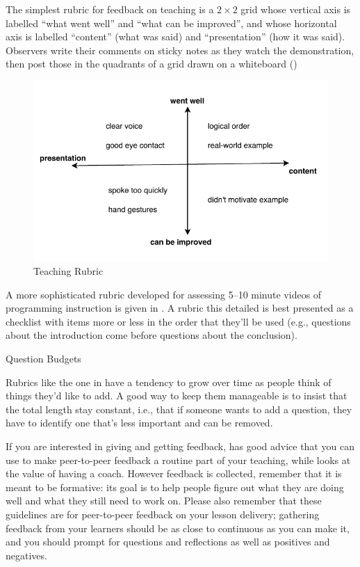The simplest rubric for feedback on teaching is a $2{\times}2$ grid
whose vertical axis is labelled ``what went well'' and ``what can be
improved'', and whose horizontal axis is labelled ``content'' (what
was said) and ``presentation'' (how it was said). Observers write
their comments on sticky notes as they watch the demonstration, then
post those in the quadrants of a grid drawn on a whiteboard
()

\begin{figure}
\centering
\includegraphics{../docs/fig/2x2-rubric.pdf}
\caption{Teaching Rubric}
\label{f:performance-rubric}
\end{figure}

A more sophisticated rubric developed for assessing 5--10 minute
videos of programming instruction is given in .  A
rubric this detailed is best presented as a checklist with items more
or less in the order that they'll be used (e.g., questions about the
introduction come before questions about the conclusion).

\begin{callout}{Question Budgets}

  Rubrics like the one in  have a tendency to grow
  over time as people think of things they'd like to add.  A good way
  to keep them manageable is to insist that the total length stay
  constant, i.e., that if someone wants to add a question, they have
  to identify one that's less important and can be removed.
  
\end{callout}

If you are interested in giving and getting feedback, \cite{Gorm2014}
has good advice that you can use to make peer-to-peer feedback a
routine part of your teaching, while \cite{Gawa2011} looks at the
value of having a coach.  However feedback is collected, remember that
it is meant to be formative: its goal is to help people figure out
what they are doing well and what they still need to work on.  Please
also remember that these guidelines are for peer-to-peer feedback on
your lesson delivery; gathering feedback from your learners should be
as close to continuous as you can make it, and you should prompt for
questions and reflections as well as positives and negatives.

